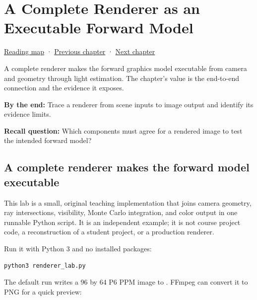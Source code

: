 \chapter{A Complete Renderer as an Executable Forward Model}\label{04-visual-computing-ii-ch035-a-complete-renderer-as-an-executable-forward-model}\hypertarget{04-visual-computing-ii-ch035}{}\label{stagechapter:04-visual-computing-ii-ch035}

\hypertarget{04-visual-computing-ii-ch035-a-complete-renderer-as-an-executable-forward-model}{}

\hyperref[volume-reading-map]{Reading map} · \hyperref[03-visual-computing-i-ch019]{Previous chapter} · \hyperref[04-visual-computing-ii-ch040]{Next chapter}

A complete renderer makes the forward graphics model executable from camera and geometry through light estimation. The chapter's value is the end-to-end connection and the evidence it exposes.

\textbf{By the end:} Trace a renderer from scene inputs to image output and identify its evidence limits.

\textbf{Recall question:} Which components must agree for a rendered image to test the intended forward model?

\section{A complete renderer makes the forward model executable}\label{04-visual-computing-ii-ch035-a-complete-renderer-makes-the-forward-model-executable}

\hypertarget{04-visual-computing-ii-ch035-a-complete-renderer-makes-the-forward-model-executable}{}

This lab is a small, original teaching implementation that joins camera geometry, ray intersections, visibility, Monte Carlo integration, and color output in one runnable Python script. It is an independent example; it is not course project code, a reconstruction of a student project, or a production renderer.

Run it with Python 3 and no installed packages:

\begin{verbatim}
python3 renderer_lab.py
\end{verbatim}

The default run writes a 96 by 64 P6 PPM image to . FFmpeg can convert it to PNG for a quick preview:

